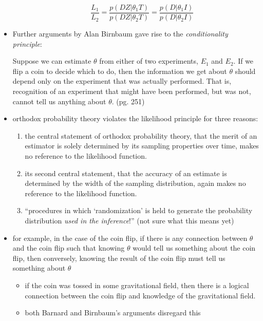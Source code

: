 \documentclass[../jaynes_prob_theory_notes.tex]{subfiles}
\begin{document}
\begin{itemize}
\begin{itemize}
\begin{equation*}
                                    \frac{L_1}{L_2} = \frac{p(DZ|{\theta}_{1}T)}{p(DZ|{\theta}_{2}T)} = \frac{p(D|{\theta}_{1}I)}{p(D|{\theta}_{2}I)}
                                \end{equation*}
                        \end{itemize}
                    \item Further arguments by Alan Birnbaum gave rise to the \textit{conditionality principle}:
                        \begin{displayquote}
                            Suppose we can estimate $\theta$ from either of two experiments, $E_1$ and $E_2$. If we flip a coin to decide which to do, then the information we get about $\theta$ should depend only on the experiment that was actually performed. That is, recognition of an experiment that might have been performed, but was not, cannot tell us anything about $\theta$. (pg. 251)
                        \end{displayquote}
                    \item orthodox probability theory violates the likelihood principle for three reasons:
                        \begin{enumerate}
                            \item the central statement of orthodox probability theory, that the merit of an estimator is solely determined by its sampling properties over time, makes no reference to the likelihood function.
                            \item its second central statement, that the accuracy of an estimate is determined by the width of the sampling distribution, again makes no reference to the likelihood function.
                            \item ``procedures in which `randomization' is held to generate the probability distribution \textit{used in the inference}!'' (not sure what this means yet)
                        \end{enumerate}
                    \item for example, in the case of the coin flip, if there is any connection between $\theta$ and the coin flip such that knowing $\theta$ would tell us something about the coin flip, then conversely, knowing the result of the coin flip must tell us something about $\theta$
                        \begin{itemize}
                            \item if the coin was tossed in some gravitational field, then there is a logical connection between the coin flip and knowledge of the gravitational field.
                            \item both Barnard and Birnbaum's arguments disregard this
                        \end{itemize}
                \end{itemize}
\end{document}
